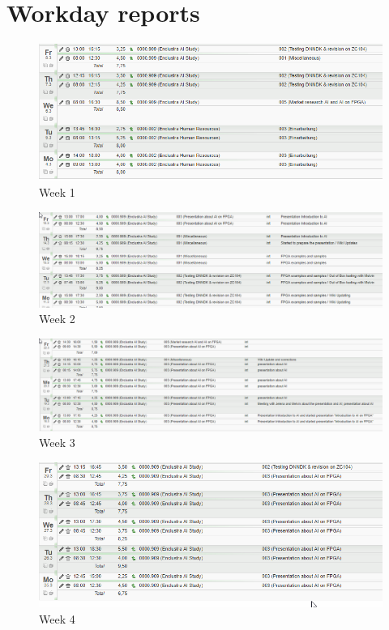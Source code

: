 
\chapter{Workday reports}

\begin{figure}[!htb]
	\centering
		\includegraphics[width=\textwidth]{timetable/week1.png}
		\caption{Week 1}
\end{figure}

\begin{figure}[!htb]
	\centering
		\includegraphics[width=\textwidth]{timetable/week2.png}
		\caption{Week 2}
\end{figure}

\begin{figure}[!htb]
	\centering
		\includegraphics[width=\textwidth]{timetable/week3.png}
		\caption{Week 3}
\end{figure}

\begin{figure}[!htb]
	\centering
		\includegraphics[width=\textwidth]{timetable/week4.png}
		\caption{Week 4}
\end{figure}

